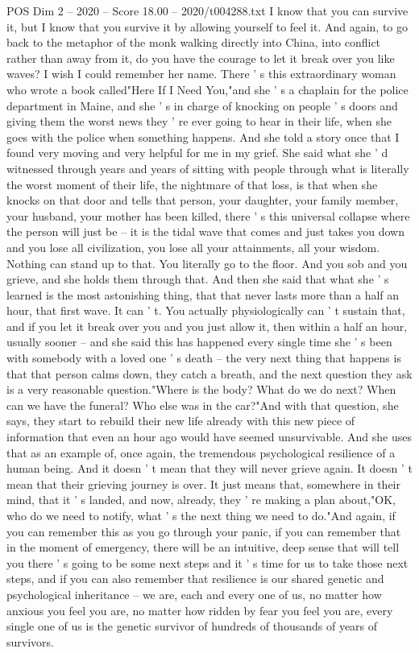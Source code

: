\begin{textsample}{POS Dim 2 – 2020 – Score 18.00 – 2020/t004288.txt}
I know that you can survive it, but I know that you survive it by allowing yourself to feel it.
And again, to go back to the metaphor of the monk walking directly into China, into conflict rather than away from it, do you have the courage to let it break over you like waves?
I wish I could remember her name.
There ' s this extraordinary woman who wrote a book called"Here If I Need You,"and she ' s a chaplain for the police department in Maine, and she ' s in charge of knocking on people ' s doors and giving them the worst news they ' re ever going to hear in their life, when she goes with the police when something happens.
And she told a story once that I found very moving and very helpful for me in my grief.
She said what she ' d witnessed through years and years of sitting with people through what is literally the worst moment of their life, the nightmare of that loss, is that when she knocks on that door and tells that person, your daughter, your family member, your husband, your mother has been killed, there ' s this universal collapse where the person will just be -- it is the tidal wave that comes and just takes you down and you lose all civilization, you lose all your attainments, all your wisdom.
Nothing can stand up to that.
You literally go to the floor.
And you sob and you grieve, and she holds them through that.
And then she said that what she ' s learned is the most astonishing thing, that that never lasts more than a half an hour, that first wave.
It can ' t.
You actually physiologically can ' t sustain that, and if you let it break over you and you just allow it, then within a half an hour, usually sooner -- and she said this has happened every single time she ' s been with somebody with a loved one ' s death -- the very next thing that happens is that that person calms down, they catch a breath, and the next question they ask is a very reasonable question."Where is the body?
What do we do next?
When can we have the funeral?
Who else was in the car?"And with that question, she says, they start to rebuild their new life already with this new piece of information that even an hour ago would have seemed unsurvivable.
And she uses that as an example of, once again, the tremendous psychological resilience of a human being.
And it doesn ' t mean that they will never grieve again.
It doesn ' t mean that their grieving journey is over.
It just means that, somewhere in their mind, that it ' s landed, and now, already, they ' re making a plan about,"OK, who do we need to notify, what ' s the next thing we need to do."And again, if you can remember this as you go through your panic, if you can remember that in the moment of emergency, there will be an intuitive, deep sense that will tell you there ' s going to be some next steps and it ' s time for us to take those next steps, and if you can also remember that resilience is our shared genetic and psychological inheritance -- we are, each and every one of us, no matter how anxious you feel you are, no matter how ridden by fear you feel you are, every single one of us is the genetic survivor of hundreds of thousands of years of survivors.

\end{textsample}
